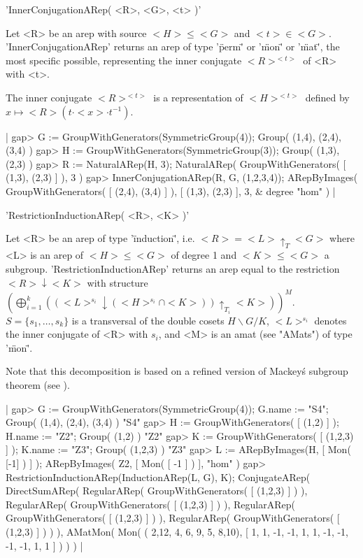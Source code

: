 
'InnerConjugationARep( <R>, <G>, <t> )'

Let <R> be an arep with source $<H>\leq <G>$ and $<t>\in <G>$. 
'InnerConjugationARep' returns an arep of type 
'\"perm\"' or '\"mon\"' or '\"mat\"', the most specific 
possible, representing the inner conjugate $<R>^{<t>}$ 
of <R> with <t>.

The inner conjugate $<R>^{<t>}$ is a representation of $<H>^{<t>}$
defined by $x\mapsto <R>(t\cdot <x>\cdot t^{-1})$.

|    gap> G := GroupWithGenerators(SymmetricGroup(4));
    Group( (1,4), (2,4), (3,4) )
    gap> H := GroupWithGenerators(SymmetricGroup(3));
    Group( (1,3), (2,3) )
    gap> R := NaturalARep(H, 3);
    NaturalARep( GroupWithGenerators( [ (1,3), (2,3) ] ), 3 )
    gap> InnerConjugationARep(R, G, (1,2,3,4));
    ARepByImages(
      GroupWithGenerators( [ (2,4), (3,4) ] ),
      [ (1,3), (2,3) ],
      3, & degree
      "hom"
    ) |


'RestrictionInductionARep( <R>, <K> )'

Let <R> be an arep of type '\"induction\"', i.e. 
$<R> = <L>\uparrow_T <G>$ where <L> is an arep of $<H>\leq <G>$ of
degree 1 and $<K> \leq <G>$ a subgroup.
'RestrictionInductionARep' returns an arep equal to the
restriction $<R>\downarrow <K>$ with structure 
$\left(\bigoplus_{i=1}^k
((<L>^{s_i}\downarrow(<H>^{s_i}\cap <K>))\uparrow_{T_i} <K>)\right)^M$.
$S = \{s_1,\dots, s_k\}$ is a transversal of the double cosets
$H\backslash G/K$, $<L>^{s_i}$ denotes the inner conjugate of <R>
with $s_i$, and <M> is an amat (see "AMats") of type '\"mon\"'.

Note that this decomposition is based on a refined version
of Mackey\'s subgroup theorem (see \cite{Pue98}).

|    gap> G := GroupWithGenerators(SymmetricGroup(4)); G.name := "S4";
    Group( (1,4), (2,4), (3,4) )
    "S4"
    gap> H := GroupWithGenerators( [ (1,2) ] ); H.name := "Z2";
    Group( (1,2) )
    "Z2"
    gap> K := GroupWithGenerators( [ (1,2,3) ] ); K.name := "Z3";
    Group( (1,2,3) )
    "Z3"
    gap> L := ARepByImages(H, [ Mon( [-1] ) ] );
    ARepByImages(
      Z2,
      [ Mon( [ -1 ] )
      ],
      "hom"
    )
    gap> RestrictionInductionARep(InductionARep(L, G), K);
    ConjugateARep(
      DirectSumARep(
        RegularARep( GroupWithGenerators( [ (1,2,3) ] ) ),
        RegularARep( GroupWithGenerators( [ (1,2,3) ] ) ),
        RegularARep( GroupWithGenerators( [ (1,2,3) ] ) ),
        RegularARep( GroupWithGenerators( [ (1,2,3) ] ) )
      ),
      AMatMon( Mon(
        ( 2,12, 4, 6, 9, 5, 8,10),
        [ 1, 1, -1, -1, 1, 1, -1, -1, -1, -1, 1, 1 ]
      ) )
    ) |

